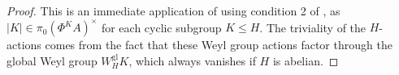 \documentclass[11pt, a4paper]{article}
\newcommand{\gl}{\mathrm{gl}}
\DeclareMathOperator{\He}{He}
\newcommand{\1}{\mathbf{1}}
\DeclareMathOperator{\map}{map}
\DeclareMathOperator{\Perf}{Perf}
\newcommand{\calF}{\mathcal{F}}
\theoremstyle{plain}
\newtheorem{prop}[equation]{Proposition}
\theoremstyle{definition}
\theoremstyle{remark}\numberwithin{equation}{section}
\begin{document}
\begin{proof}
    This is an immediate application of  using condition 2 of , as $|K| \in \pi_0 (\Phi^K A)^\times$ for each cyclic subgroup $K\leq H$. The triviality of the $H$-actions comes from the fact that these Weyl group actions factor through the global Weyl group $W_H^\gl K$, which always vanishes if $H$ is abelian.
\end{proof}


\end{document}
